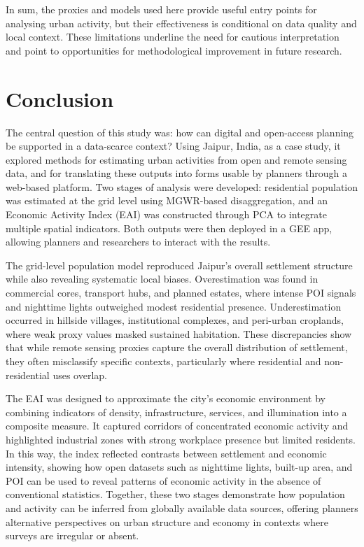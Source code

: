 \documentclass[
  12pt,
  oneside]{book}
\begin{document}
In sum, the proxies and models used here provide useful entry points for analysing urban activity, but their effectiveness is conditional on data quality and local context. These limitations underline the need for cautious interpretation and point to opportunities for methodological improvement in future research.

\chapter{Conclusion}\label{conclusion}

The central question of this study was: how can digital and open-access planning be supported in a data-scarce context? Using Jaipur, India, as a case study, it explored methods for estimating urban activities from open and remote sensing data, and for translating these outputs into forms usable by planners through a web-based platform. Two stages of analysis were developed: residential population was estimated at the grid level using MGWR-based disaggregation, and an Economic Activity Index (EAI) was constructed through PCA to integrate multiple spatial indicators. Both outputs were then deployed in a GEE app, allowing planners and researchers to interact with the results.

The grid-level population model reproduced Jaipur's overall settlement structure while also revealing systematic local biases. Overestimation was found in commercial cores, transport hubs, and planned estates, where intense POI signals and nighttime lights outweighed modest residential presence. Underestimation occurred in hillside villages, institutional complexes, and peri-urban croplands, where weak proxy values masked sustained habitation. These discrepancies show that while remote sensing proxies capture the overall distribution of settlement, they often misclassify specific contexts, particularly where residential and non-residential uses overlap.

The EAI was designed to approximate the city's economic environment by combining indicators of density, infrastructure, services, and illumination into a composite measure. It captured corridors of concentrated economic activity and highlighted industrial zones with strong workplace presence but limited residents. In this way, the index reflected contrasts between settlement and economic intensity, showing how open datasets such as nighttime lights, built-up area, and POI can be used to reveal patterns of economic activity in the absence of conventional statistics. Together, these two stages demonstrate how population and activity can be inferred from globally available data sources, offering planners alternative perspectives on urban structure and economy in contexts where surveys are irregular or absent.
\end{document}
